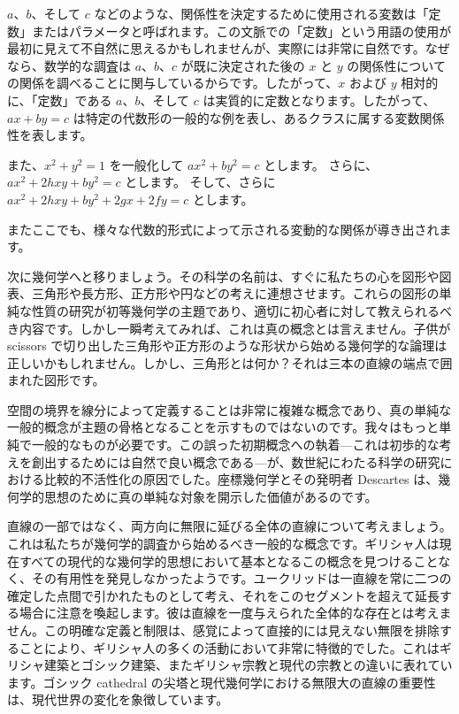 \documentclass[a4paper,11pt,openany]{ltjsbook}
\begin{document}
$a$、$b$、そして $c$ などのような、関係性を決定するために使用される変数は「定数」またはパラメータと呼ばれます。この文脈での「定数」という用語の使用が最初に見えて不自然に思えるかもしれませんが、実際には非常に自然です。なぜなら、数学的な調査は $a$、$b$、$c$ が既に決定された後の $x$ と $y$ の関係性についての関係を調べることに関与しているからです。したがって、$x$ および $y$ 相対的に、「定数」である $a$、$b$、そして $c$ は実質的に定数となります。したがって、$ax + by = c$ は特定の代数形の一般的な例を表し、あるクラスに属する変数関係性を表します。


また、$x^{2} + y^{2} = 1$ を一般化して $ax^{2} + by^{2} = c$ とします。
さらに、$ax^{2} + 2hxy + by^{2} = c$ とします。
そして、さらに $ax^{2} + 2hxy + by^{2} + 2gx + 2fy = c$ とします。

またここでも、様々な代数的形式によって示される変動的な関係が導き出されます。

次に幾何学へと移りましょう。その科学の名前は、すぐに私たちの心を図形や図表、三角形や長方形、正方形や円などの考えに連想させます。これらの図形の単純な性質の研究が初等幾何学の主題であり、適切に初心者に対して教えられるべき内容です。しかし一瞬考えてみれば、これは真の概念とは言えません。子供が scissors で切り出した三角形や正方形のような形状から始める幾何学的な論理は正しいかもしれません。しかし、三角形とは何か？それは三本の直線の端点で囲まれた図形です。

空間の境界を線分によって定義することは非常に複雑な概念であり、真の単純な一般的概念が主題の骨格となることを示すものではないのです。我々はもっと単純で一般的なものが必要です。この誤った初期概念への執着---これは初歩的な考えを創出するためには自然で良い概念である---が、数世紀にわたる科学の研究における比較的不活性化の原因でした。座標幾何学とその発明者 Descartes は、幾何学的思想のために真の単純な対象を開示した価値があるのです。

直線の一部ではなく、両方向に無限に延びる全体の直線について考えましょう。これは私たちが幾何学的調査から始めるべき一般的な概念です。ギリシャ人は現在すべての現代的な幾何学的思想において基本となるこの概念を見つけることなく、その有用性を発見しなかったようです。ユークリッドは一直線を常に二つの確定した点間で引かれたものとして考え、それをこのセグメントを超えて延長する場合に注意を喚起します。彼は直線を一度与えられた全体的な存在とは考えません。この明確な定義と制限は、感覚によって直接的には見えない無限を排除することにより、ギリシャ人の多くの活動において非常に特徴的でした。これはギリシャ建築とゴシック建築、またギリシャ宗教と現代の宗教との違いに表れています。ゴシック cathedral の尖塔と現代幾何学における無限大の直線の重要性は、現代世界の変化を象徴しています。
\end{document}

